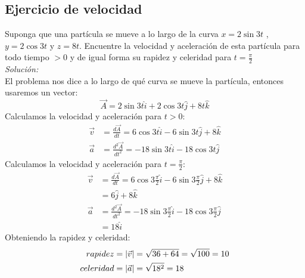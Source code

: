 \documentclass[12pt,openany]{book}
\begin{document}
		\subsection{Ejercicio de velocidad}
			Suponga que una part\'icula se mueve a lo largo de la curva $x=2\sin3t$ , $y=2\cos3t$ y $z=8t$. 
			Encuentre la velocidad y aceleraci\'on de esta part\'icula para todo tiempo $>0$ y de igual forma
			su rapidez y celeridad para $t=\frac{\pi}{2}$\\
			\noindent\textsl{Soluci\'on:}\\
			El problema nos dice a lo largo de qu\'e curva se mueve la part\'icula, entonces usaremos un vector:
			$$
				\vec{A}=2\sin3t\hat{i}+2\cos3t\hat{j}+8t\hat{k}
			$$
			Calculamos la velocidad y aceleraci\'on para $t>0$:\\
			\begin{equation*}
				\begin{split}
					\vec{v}&=\frac{d\vec{A}}{dt}=6\cos3t\hat{i}-6\sin3t\hat{j}+8\hat{k} \\
					\vec{a}&=\frac{d^{2}\vec{A}}{dt^{2}}=-18\sin3t\hat{i}-18\cos3t\hat{j} 
				\end{split}
			\end{equation*}	
			Calculamos la velocidad y aceleraci\'on para $t=\frac{\pi}{2}$:
			\begin{equation*}
				\begin{split}
					\vec{v}&=\frac{d\vec{A}}{dt}=6\cos3\frac{\pi}{2}\hat{i}-6\sin3\frac{\pi}{2}\hat{j}+8\hat{k}\\
						   &=6\hat{j}+8\hat{k} \\
					\vec{a}&=\frac{d^{2}\vec{A}}{dt^{2}}=-18\sin3\frac{\pi}{2}\hat{i}-18\cos3\frac{\pi}{2}\hat{j}\\
						   &=18\hat{i}
				\end{split}
			\end{equation*}	
			Obteniendo la rapidez y celeridad:
			\begin{equation*}
				\begin{split}
					\mathnormal{rapidez}&=|\vec{v}|=\sqrt{36+64}=\sqrt{100}=10 \\
					\mathnormal{celeridad}&=|\vec{a}|=\sqrt{18^{2}}=18
				\end{split}
			\end{equation*}				

\end{document}
